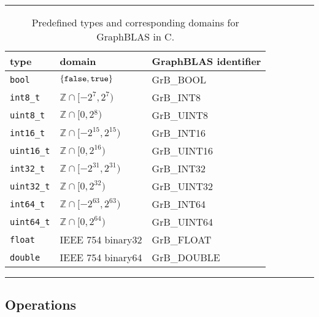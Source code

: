 \documentclass[11pt]{extarticle}
\begin{document}
\begin{table}
\hrule
\begin{center}
\caption{Predefined types and corresponding domains for GraphBLAS in C. 
              }
\label{Tab:PredefinedTypes}
\begin{tabular}{l|l|l}
type	& domain & GraphBLAS identifier \\ \hline
{\tt bool}	& $\{ {\tt false}, {\tt true} \}$	& {\sf GrB\_BOOL} \\
{\tt int8\_t}	& $\mathbb{Z} \cap [-2^{7},2^{7})$ 	& {\sf GrB\_INT8} \\
{\tt uint8\_t}	& $\mathbb{Z} \cap [0,2{^8})$ 		& {\sf GrB\_UINT8} \\
{\tt int16\_t}	& $\mathbb{Z} \cap [-2^{15},2^{15})$ 	& {\sf GrB\_INT16} \\
{\tt uint16\_t}	& $\mathbb{Z} \cap [0,2^{16})$ 		& {\sf GrB\_UINT16} \\
{\tt int32\_t}	& $\mathbb{Z} \cap [-2^{31},2^{31})$ 	& {\sf GrB\_INT32} \\
{\tt uint32\_t}	& $\mathbb{Z} \cap [0,2^{32})$ 		& {\sf GrB\_UINT32} \\
{\tt int64\_t}	& $\mathbb{Z} \cap [-2^{63},2^{63})$ 	& {\sf GrB\_INT64} \\
{\tt uint64\_t}	& $\mathbb{Z} \cap [0,2^{64})$ 		& {\sf GrB\_UINT64} \\
{\tt float}	& IEEE 754 {\sf binary32} 		& {\sf GrB\_FLOAT} \\
{\tt double}	& IEEE 754 {\sf binary64} 		& {\sf GrB\_DOUBLE} \\
\end{tabular}
\end{center}
\hrule
\end{table}

\subsection{Operations}
\end{document}
